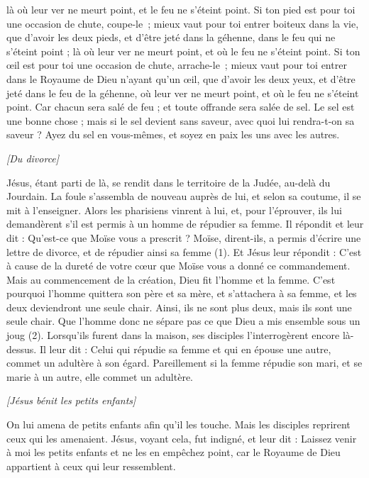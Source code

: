 \begin{multicols}{2}
là où leur ver ne meurt point, et le feu ne s'éteint point.
Si ton pied est pour toi une occasion de chute, coupe-le ; mieux vaut pour toi entrer boiteux dans la vie, que d'avoir les deux pieds, et d’être jeté dans la géhenne, dans le feu qui ne s'éteint point ;
là où leur ver ne meurt point, et où le feu ne s'éteint point.
Si ton œil est pour toi une occasion de chute, arrache-le ; mieux vaut pour toi entrer dans le Royaume de Dieu n'ayant qu'un œil, que d'avoir les deux yeux, et d’être jeté dans le feu de la géhenne,
où leur ver ne meurt point, et où le feu ne s'éteint point.
Car chacun sera salé de feu ; et toute offrande sera salée de sel.
Le sel est une bonne chose ; mais si le sel devient sans saveur, avec quoi lui rendra-t-on sa saveur ?
Ayez du sel en vous-mêmes, et soyez en paix les uns avec les autres.
\begin{center}
\textit{[Du divorce]}
\end{center}
\VerseOne{}Jésus, étant parti de là, se rendit dans le territoire de la Judée, au-delà du Jourdain. La foule s’assembla de nouveau auprès de lui, et selon sa coutume, il se mit à l’enseigner.
Alors les pharisiens vinrent à lui, et, pour l'éprouver, ils lui demandèrent s’il est permis à un homme de répudier sa femme.
Il répondit et leur dit : Qu'est-ce que Moïse vous a prescrit ?
Moïse, dirent-ils, a permis d'écrire une lettre de divorce, et de répudier ainsi sa femme (1).
Et Jésus leur répondit : C’est à cause de la dureté de votre cœur que Moïse vous a donné ce commandement.
Mais au commencement de la création, Dieu fit l’homme et la femme.
C'est pourquoi l'homme quittera son père et sa mère, et s'attachera à sa femme,
et les deux deviendront une seule chair. Ainsi, ils ne sont plus deux, mais ils sont une seule chair.
Que l'homme donc ne sépare pas ce que Dieu a mis ensemble sous un joug (2).
Lorsqu’ils furent dans la maison, ses disciples l'interrogèrent encore là-dessus.
Il leur dit : Celui qui répudie sa femme et qui en épouse une autre, commet un adultère à son égard.
Pareillement si la femme répudie son mari, et se marie à un autre, elle commet un adultère.
\begin{center}
\textit{[Jésus bénit les petits enfants]}
\end{center}
\PPE{}
On lui amena de petits enfants afin qu'il les touche. Mais les disciples reprirent ceux qui les amenaient.
Jésus, voyant cela, fut indigné, et leur dit : Laissez venir à moi les petits enfants et ne les en empêchez point, car le Royaume de Dieu appartient à ceux qui leur ressemblent.

\end{multicols}
